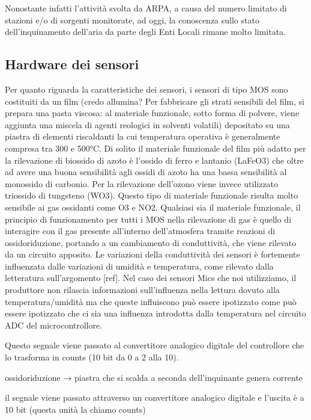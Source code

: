 Nonostante infatti l’attività svolta da ARPA, a causa del numero limitato di stazioni e/o di sorgenti monitorate, ad oggi, la conoscenza sullo stato dell’inquinamento dell’aria da parte degli Enti Locali rimane molto limitata.

\subsection{Hardware dei sensori}\label{ssec:hardware}
Per quanto riguarda la caratteristiche dei sensori, i sensori di tipo MOS sono costituiti da un film (credo allumina? Per  fabbricare  gli  strati  sensibili  del  film,  si  prepara  una  pasta  viscosa:  al  materiale funzionale,  sotto  forma  di  polvere,  viene  aggiunta  una  miscela  di  agenti  reologici  in  solventi  volatili) depositato su una piastra di elementi riscaldanti la cui temperatura operativa è generalmente compresa tra 300 e 500°C. Di solito il  materiale funzionale del film più  adatto per  la  rilevazione di  biossido  di  azoto è l’ossido  di  ferro  e lantanio (LaFeO3) che oltre ad avere una buona sensibilità agli ossidi di azoto ha una  bassa  sensibilità  al  monossido  di  carbonio. Per la rilevazione dell’ozono viene invece utilizzato  triossido di tungsteno (WO3). Questo tipo  di  materiale  funzionale risulta  molto  sensibile  ai  gas  ossidanti  come  O3 e  NO2. Qualsiasi sia il materiale funzionale, il principio di funzionamento per tutti i MOS nella rilevazione di gas è quello di interagire con il gas presente all’interno dell’atmosfera tramite reazioni di ossidoriduzione, portando a un cambiamento di conduttività, che viene rilevato da un circuito apposito. Le variazioni della conduttività dei sensori è fortemente influenzata dalle variazioni di umidità e temperatura, come rilevato dalla letteratura sull'argomento [ref]. Nel caso dei sensori Mics che noi utilizziamo, il produttore non rilascia informazioni sull'influenza nella lettura dovuto alla temperatura/umidità  ma che queste influiscono può essere ipotizzato come può essere ipotizzato che ci sia una influenza introdotta dalla temperatura nel circuito ADC del microcontrollore.

Questo segnale viene passato al convertitore analogico digitale del controllore che lo trasforma in counts (10 bit da 0 a 2 alla 10).

ossidoriduzione → piastra che si scalda a seconda dell'inquinante genera corrente

il segnale viene passato attraverso un convertitore analogico digitale e l’uscita è a 10 bit (questa unità la chiamo counts)


